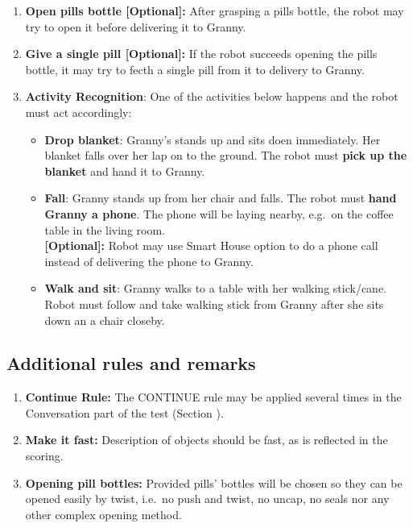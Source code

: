 \begin{enumerate}
 	\item \textbf{Open pills bottle [Optional]:} After grasping a pills bottle, the robot may try to open it before delivering it to Granny.

 	\item \textbf{Give a single pill [Optional]:} If the robot succeeds opening the pills bottle, it may try to fecth a single pill from it to delivery to Granny.

 	\item \textbf{Activity Recognition}: One of the activities below happens and the robot must act accordingly:
 	\begin{itemize}
 		\item \textbf{Drop blanket}: Granny's stands up and sits doen immediately. Her blanket falls over her lap on to the ground. The robot must \textbf{pick up the blanket} and hand it to Granny.

 		\item \textbf{Fall}: Granny stands up from her chair and falls. The robot must \textbf{hand Granny a phone}. The phone will be laying nearby, e.g.~on the coffee table in the living room. \\
		\textbf{[Optional]:} Robot may use Smart House option to do a phone call instead of delivering the phone to Granny.

 		\item \textbf{Walk and sit}: Granny walks to a table with her walking stick/cane. Robot must follow and take walking stick from Granny after she sits down an a chair closeby.
 	\end{itemize}
\end{enumerate}


\subsection{Additional rules and remarks}
\begin{enumerate}
\item \textbf{Continue Rule:} The CONTINUE rule may be applied several times in the Conversation part of the test (Section ).
\item \textbf{Make it fast:} Description of objects should be fast, as is reflected in the scoring.
\item \textbf{Opening pill bottles:} Provided pills' bottles will be chosen so they can be opened easily by twist, i.e.~no push and twist, no uncap, no seals nor any other complex opening method.
\end{enumerate}

